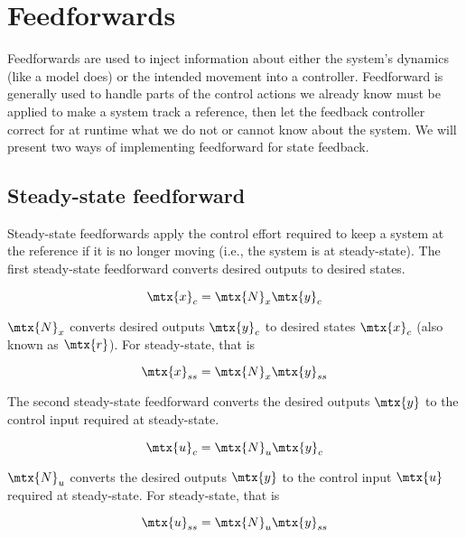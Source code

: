\section{Feedforwards}

Feedforwards are used to inject information about either the \gls{system}'s
dynamics (like a \gls{model} does) or the intended movement into a controller.
Feedforward is generally used to handle parts of the control actions we already
know must be applied to make a \gls{system} track a \gls{reference}, then let
the feedback controller correct for at runtime what we do not or cannot know
about the \gls{system}. We will present two ways of implementing feedforward for
\gls{state} feedback.

\subsection{Steady-state feedforward}

Steady-state feedforwards apply the \gls{control effort} required to keep a
\gls{system} at the \gls{reference} if it is no longer moving (i.e., the
\gls{system} is at steady-state). The first steady-state feedforward converts
desired \glspl{output} to desired \glspl{state}.

\begin{equation*}
  \mtx{x}_c = \mtx{N}_x\mtx{y}_c
\end{equation*}

$\mtx{N}_x$ converts desired \glspl{output} $\mtx{y}_c$ to desired \glspl{state}
$\mtx{x}_c$ (also known as $\mtx{r}$). For steady-state, that is

\begin{equation}
  \mtx{x}_{ss} = \mtx{N}_x\mtx{y}_{ss} \label{eq:x_ss}
\end{equation}

The second steady-state feedforward converts the desired \glspl{output}
$\mtx{y}$ to the \gls{control input} required at steady-state.

\begin{equation*}
  \mtx{u}_c = \mtx{N}_u\mtx{y}_c
\end{equation*}

$\mtx{N}_u$ converts the desired \glspl{output} $\mtx{y}$ to the
\gls{control input} $\mtx{u}$ required at steady-state. For steady-state, that
is

\begin{equation}
  \mtx{u}_{ss} = \mtx{N}_u\mtx{y}_{ss} \label{eq:u_ss}
\end{equation}

